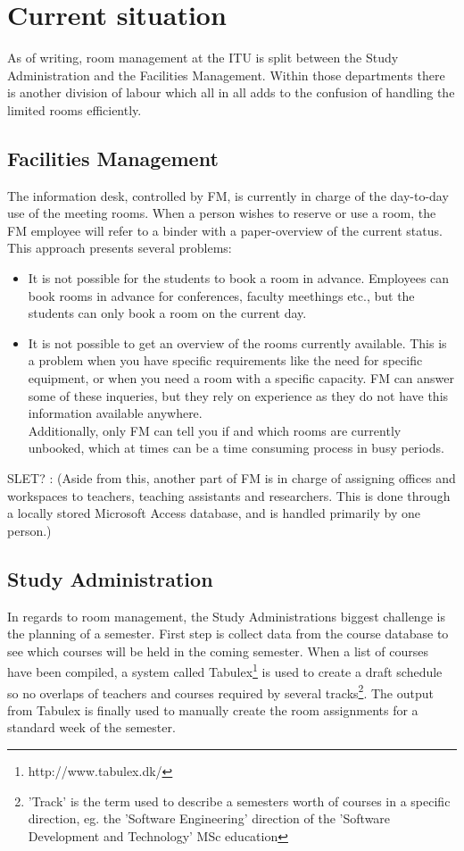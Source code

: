 \pagebreak
\label{sec:current_situation}
\section{Current situation}
As of writing, room management at the ITU is split between the Study Administration and the Facilities Management. Within those departments there is another division of labour which all in all adds to the confusion of handling the limited rooms efficiently.

\subsection{Facilities Management}
The information desk, controlled by FM, is currently in charge of the day-to-day use of the meeting rooms. When a person wishes to reserve or use a room, the FM employee will refer to a binder with a paper-overview of the current status.\\

This approach presents several problems:
\begin{itemize}
	\item It is not possible for the students to book a room in advance. Employees can book rooms in advance for conferences, faculty meethings etc., but the students can only book a room on the current day.
	\item It is not possible to get an overview of the rooms currently available. This is a problem when you have specific requirements like the need for specific equipment, or when you need a room with a specific capacity. FM can answer some of these inqueries, but they rely on experience as they do not have this information available anywhere.\\ Additionally, only FM can tell you if and which rooms are currently unbooked, which at times can be a time consuming process in busy periods.
\end{itemize}

SLET? : (Aside from this, another part of FM is in charge of assigning offices and workspaces to teachers, teaching assistants and researchers. This is done through a locally stored Microsoft Access database, and is handled primarily by one person.)

\subsection{Study Administration}
In regards to room management, the Study Administrations biggest challenge is the planning of a semester. First step is collect data from the course database to see which courses will be held in the coming semester. When a list of courses have been compiled, a system called Tabulex\footnote{http://www.tabulex.dk/} is used to create a draft schedule so no overlaps of teachers and courses required by several tracks\footnote{'Track' is the term used to describe a semesters worth of courses in a specific direction, eg. the 'Software Engineering' direction of the 'Software Development and Technology' MSc education}. The output from Tabulex is finally used to manually create the room assignments for a standard week of the semester.

